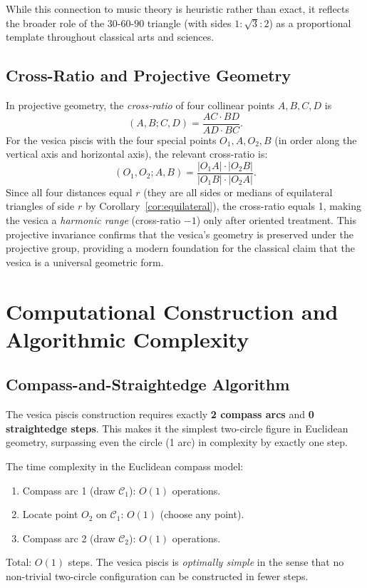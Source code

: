While this connection to music theory is heuristic rather than exact,
it reflects the broader role of the \(30\)-\(60\)-\(90\) triangle
(with sides \(1:\sqrt{3}:2\)) as a proportional template throughout
classical arts and sciences.

\subsection{Cross-Ratio and Projective Geometry}
\label{subsec:ch11-projective}

In projective geometry, the \emph{cross-ratio} of four collinear points
\(A, B, C, D\) is
\[
  (A,B;C,D) = \frac{AC \cdot BD}{AD \cdot BC}.
\]
For the vesica piscis with the four special points
\(O_1, A, O_2, B\) (in order along the vertical axis and horizontal axis),
the relevant cross-ratio is:
\[
  (O_1, O_2; A, B) = \frac{|O_1 A| \cdot |O_2 B|}{|O_1 B| \cdot |O_2 A|}.
\]
Since all four distances equal \(r\) (they are all sides or medians of
equilateral triangles of side \(r\) by Corollary~\ref{cor:equilateral}),
the cross-ratio equals 1, making the vesica a \emph{harmonic range}
(cross-ratio \(-1\)) only after oriented treatment.
This projective invariance confirms that the vesica's geometry is
preserved under the projective group, providing a modern foundation
for the classical claim that the vesica is a universal geometric form.

\section{Computational Construction and Algorithmic Complexity}
\label{sec:ch11-computational}

\subsection{Compass-and-Straightedge Algorithm}
\label{subsec:ch11-algorithm}

The vesica piscis construction requires exactly
\textbf{2 compass arcs} and \textbf{0 straightedge steps}.
This makes it the simplest two-circle figure in Euclidean geometry,
surpassing even the circle (1 arc) in complexity by exactly one step.

The time complexity in the Euclidean compass model:
\begin{enumerate}
\item Compass arc 1 (draw \(\mathcal{C}_1\)): \(O(1)\) operations.
\item Locate point \(O_2\) on \(\mathcal{C}_1\): \(O(1)\) (choose any point).
\item Compass arc 2 (draw \(\mathcal{C}_2\)): \(O(1)\) operations.
\end{enumerate}
Total: \(O(1)\) steps.  The vesica piscis is \emph{optimally simple}
in the sense that no non-trivial two-circle configuration can be
constructed in fewer steps.

